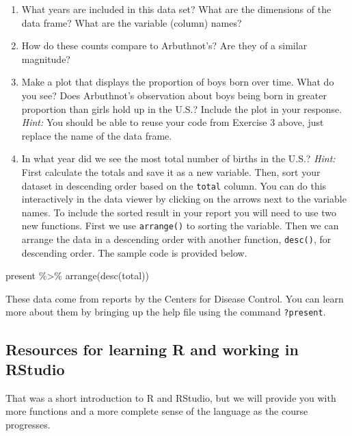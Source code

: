 \documentclass[
]{article}
\newenvironment{Shaded}{\begin{snugshade}}{\end{snugshade}}
\newcommand{\FunctionTok}[1]{\textcolor[rgb]{0.00,0.00,0.00}{#1}}
\newcommand{\NormalTok}[1]{#1}
\newcommand{\SpecialCharTok}[1]{\textcolor[rgb]{0.00,0.00,0.00}{#1}}
\begin{document}
\begin{enumerate}
\def\labelenumi{\arabic{enumi}.}
\item
  What years are included in this data set? What are the dimensions of the data frame? What are the variable (column) names?
\item
  How do these counts compare to Arbuthnot's? Are they of a similar magnitude?
\item
  Make a plot that displays the proportion of boys born over time. What do you see? Does Arbuthnot's observation about boys being born in greater proportion than girls hold up in the U.S.? Include the plot in your response. \emph{Hint:} You should be able to reuse your code from Exercise 3 above, just replace the name of the data frame.
\item
  In what year did we see the most total number of births in the U.S.? \emph{Hint:} First calculate the totals and save it as a new variable. Then, sort your dataset in descending order based on the \texttt{total} column. You can do this interactively in the data viewer by clicking on the arrows next to the variable names. To include the sorted result in your report you will need to use two new functions. First we use \texttt{arrange()} to sorting the variable. Then we can arrange the data in a descending order with another function, \texttt{desc()}, for descending order. The sample code is provided below.
\end{enumerate}

\begin{Shaded}
\begin{Highlighting}[]
\NormalTok{present }\SpecialCharTok{\%\textgreater{}\%}
  \FunctionTok{arrange}\NormalTok{(}\FunctionTok{desc}\NormalTok{(total))}
\end{Highlighting}
\end{Shaded}

These data come from reports by the Centers for Disease Control. You can learn more about them by bringing up the help file using the command \texttt{?present}.

\hypertarget{resources-for-learning-r-and-working-in-rstudio}{%
\subsection{Resources for learning R and working in RStudio}\label{resources-for-learning-r-and-working-in-rstudio}}

That was a short introduction to R and RStudio, but we will provide you with more functions and a more complete sense of the language as the course progresses.
\end{document}
